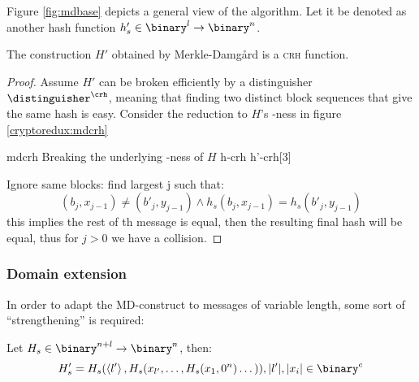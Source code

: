 Figure \ref{fig:mdbase} depicts a general view of the algorithm. Let it be denoted as another hash function $h'_s \in \binary^l \to \binary^n$.

\begin{theorem}
    The construction $H'$ obtained by Merkle-Damg\r{a}rd is a \textsc{crh} function.
\end{theorem}

\begin{proof}
    Assume $H'$ can be broken efficiently by a distinguisher $\distinguisher^{\crh}$, meaning that finding two distinct block sequences that give the same hash is easy. Consider the reduction to $H$'s \crh-ness in figure \ref{cryptoredux:mdcrh}

    \begin{cryptoredux}
        {mdcrh}
        {Breaking the underlying \crh-ness of $H$}
        {h-crh}
        {h'-crh}[3]


        \cseqdelay


    \end{cryptoredux}

    Ignore same blocks: find largest j such that:
    \[
        (b_j, x_{j - 1}) \neq (b'_j, y_{j - 1}) \wedge h_s(b_j, x_{j - 1}) = h_s(b'_j, y_{j - 1})
    \]
    this implies the rest of th message is equal, then the resulting final hash will be equal, thus for $j > 0$ we have a collision.

\end{proof}

\subsubsection{Domain extension}

In order to adapt the MD-construct to messages of variable length, some sort of ``strengthening'' is required: 

\begin{lemma}
    Let $H_s \in \binary^{n + l} \to \binary^n$, then:
    \[
        H'_s = H_s(\left<l'\right>, H_s(x_{l'}, \dots , H_s(x_1, 0^n) \dots)), |l'|, |x_i| \in \binary^c 
    \]
\end{lemma}

